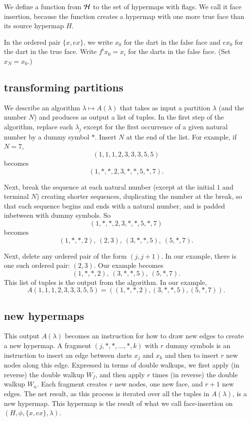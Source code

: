 We define a function from $\cal H$ to the set of hypermaps with
flags.  We call it face insertion, because the function creates a
hypermap with one more true face than its source hypermap $H$.

In the ordered pair $\{x,e x\}$, we write $x_0$ for the dart in the
false face and $e x_0$ for the dart in the true face.  Write $f^i
x_0 = x_i$ for the darts in the false face.  (Set $x_N = x_0$.)

\subsection{transforming partitions}

We describe an algorithm $\lambda\mapsto A(\lambda)$ that takes
as input a partition $\lambda$ (and the number $N$)
and produces as output a list of
tuples.
In the first step of the algorithm,
replace each $\lambda_j$ except for the
first occurrence of a given natural number by a dummy symbol $*$.
Insert $N$ at the end of the list. For example, if $N=7$,
    $$(1,1,1,2,3,3,3,5,5)$$ becomes
    $$(1,*,*,2,3,*,*,5,*,7).$$

Next, break the sequence at each natural number (except at the initial $1$
and terminal $N$)
creating shorter sequences, duplicating the number at the break,
so that each sequence begins and ends with a natural number,
and is padded inbetween with dummy symbols. So
    $$(1,*,*,2,3,*,*,5,*,7)$$ becomes
$$(1,*,*,2),\ (2,3),\ (3,*,*,5),\ (5,*,7).$$

Next,
delete any ordered pair of the form $(j,j+1)$. In our example, there
is one such ordered pair: $(2,3)$.  Our example becomes
  $$
  (1,*,*,2),\  (3,*,*,5),\ (5,*,7).
  $$
This list of tuples is the output from the algorithm.
In our example,
  $$A(1,1,1,2,3,3,3,5,5) = ((1,*,*,2),(3,*,*,5),(5,*,7)).$$



\subsection{new hypermaps}

This output $A(\lambda)$
becomes an instruction for how to draw new edges to create a
new hypermap. A fragment $(j,*,*,\ldots,*,k)$ with $r$ dummy symbols
is an instruction to insert an edge between darts $x_j$ and $x_k$
and then to insert $r$ new nodes along this edge.
Expressed in terms of double walkups, we first apply (in
reverse) the double walkup $W_f$, and then apply $r$ times (in
reverse) the double walkup $W_n$.  Each fragment creates $r$ new
nodes, one new face, and $r+1$ new edges.  The net result, as this process is
iterated over all the tuples in $A(\lambda)$, is a new hypermap. 
This hypermap is the result of what we call face-insertion
on $(H,\phi,\{x,e x\},\lambda)$.

